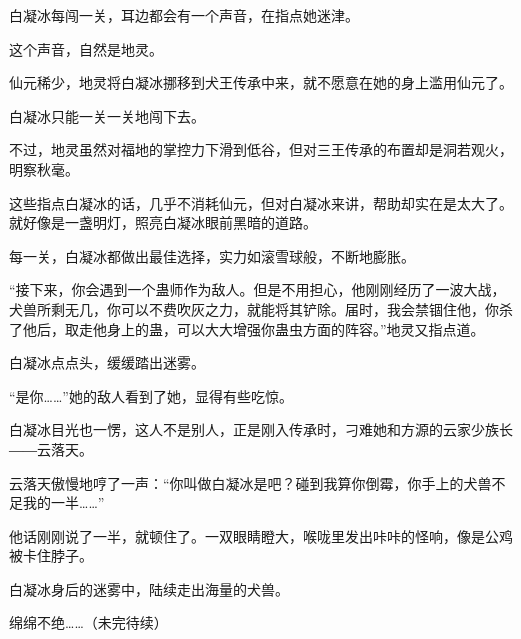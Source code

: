 \begin{this_body}
白凝冰每闯一关，耳边都会有一个声音，在指点她迷津。

这个声音，自然是地灵。

仙元稀少，地灵将白凝冰挪移到犬王传承中来，就不愿意在她的身上滥用仙元了。

白凝冰只能一关一关地闯下去。

不过，地灵虽然对福地的掌控力下滑到低谷，但对三王传承的布置却是洞若观火，明察秋毫。

这些指点白凝冰的话，几乎不消耗仙元，但对白凝冰来讲，帮助却实在是太大了。就好像是一盏明灯，照亮白凝冰眼前黑暗的道路。

每一关，白凝冰都做出最佳选择，实力如滚雪球般，不断地膨胀。

“接下来，你会遇到一个蛊师作为敌人。但是不用担心，他刚刚经历了一波大战，犬兽所剩无几，你可以不费吹灰之力，就能将其铲除。届时，我会禁锢住他，你杀了他后，取走他身上的蛊，可以大大增强你蛊虫方面的阵容。”地灵又指点道。

白凝冰点点头，缓缓踏出迷雾。

“是你……”她的敌人看到了她，显得有些吃惊。

白凝冰目光也一愣，这人不是别人，正是刚入传承时，刁难她和方源的云家少族长――云落天。

云落天傲慢地哼了一声：“你叫做白凝冰是吧？碰到我算你倒霉，你手上的犬兽不足我的一半……”

他话刚刚说了一半，就顿住了。一双眼睛瞪大，喉咙里发出咔咔的怪响，像是公鸡被卡住脖子。

白凝冰身后的迷雾中，陆续走出海量的犬兽。

绵绵不绝……（未完待续）

\end{this_body}

